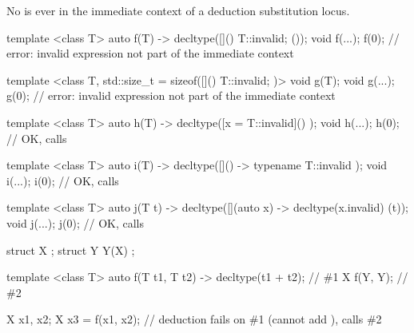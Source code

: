 \pnum
\begin{note}
No  is ever in the immediate context
of a deduction substitution locus.
\begin{example}
\begin{codeblock}
template <class T>
  auto f(T) -> decltype([]() { T::invalid; } ());
void f(...);
f(0);               // error: invalid expression not part of the immediate context

template <class T, std::size_t = sizeof([]() { T::invalid; })>
  void g(T);
void g(...);
g(0);               // error: invalid expression not part of the immediate context

template <class T>
  auto h(T) -> decltype([x = T::invalid]() { });
void h(...);
h(0);               // OK, calls 

template <class T>
  auto i(T) -> decltype([]() -> typename T::invalid { });
void i(...);
i(0);               // OK, calls 

template <class T>
  auto j(T t) -> decltype([](auto x) -> decltype(x.invalid) { } (t));
void j(...);
j(0);               // OK, calls 
\end{codeblock}
\end{example}
\end{note}

\pnum
\begin{example}
\begin{codeblock}
struct X { };
struct Y {
  Y(X) {}
};

template <class T> auto f(T t1, T t2) -> decltype(t1 + t2);     // \#1
X f(Y, Y);                                                      // \#2

X x1, x2;
X x3 = f(x1, x2);   // deduction fails on \#1 (cannot add ), calls \#2
\end{codeblock}
\end{example}

